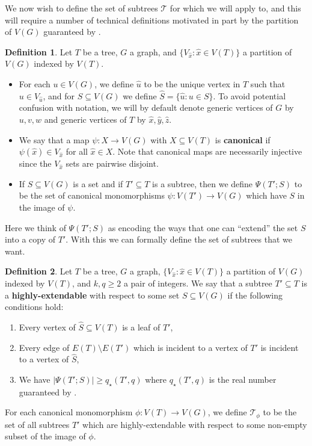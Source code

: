 \documentclass[12pt,letterpaper]{article}
\theoremstyle{definition}
\newtheorem{definition}{Definition}
\newcommand{\pow}{q} %
\newcommand{\Pow}{{q_\star}} %
\renewcommand{\c}[1]{\mathcal{#1}}
\newcommand{\sm}{\setminus}
\newcommand{\sub}{\subseteq}
\begin{document}
	We now wish to define the set of subtrees $\c{T}$ for which we will apply  to, and this will require a number of technical definitions motivated in part by the partition of $V(G)$ guaranteed by .  
	
	\begin{definition}
		Let $T$ be a tree, $G$ a graph, and $\{V_{\hat{x}}:\hat{x}\in V(T)\}$ a partition of $V(G)$ indexed by $V(T)$.
		\begin{itemize}
			\item For each $u\in V(G)$, we define $\hat{u}$ to be the unique vertex in $T$ such that $u\in V_{\hat{u}}$, and for $S\sub V(G)$ we define $\widehat{S}=\{\hat{u}:u\in S\}$.  To avoid potential confusion with notation, we will by default denote generic vertices of $G$ by $u,v,w$ and generic vertices of $T$ by $\hat{x},\hat{y},\hat{z}$.  
			\item We say that a map $\psi:X\to V(G)$ with $X\sub V(T)$ is \textbf{canonical} if $\psi(\hat{x})\in V_{\hat{x}}$ for all $\hat{x}\in X$.  Note that canonical maps are necessarily injective since the $V_{\hat{x}}$ sets are pairwise disjoint. 
			\item If $S\sub V(G)$ is a set and if $T'\sub T$ is a subtree, then we define $\Psi(T';S)$ to be the set of canonical monomorphisms $\psi:V(T')\to V(G)$ which have $S$ in the image of $\psi$.
		\end{itemize}
	\end{definition}
	Here we think of $\Psi(T';S)$ as encoding the ways that one can ``extend'' the set $S$ into a copy of $T'$. With this we can formally define the set of subtrees that we want.
	
	\begin{definition}
		Let $T$ be a tree, $G$ a graph, $\{V_{\hat{x}}:\hat{x}\in V(T)\}$ a partition of $V(G)$ indexed by $V(T)$, and $k,\pow\ge 2$ a pair of integers.  We say that a subtree $T'\sub T$ is a \textbf{highly-extendable} with respect to some set $S\sub V(G)$ if the following conditions hold:
		\begin{enumerate}[label=(\alph*)]
			\item Every vertex of $\widehat{S}\sub V(T)$ is a leaf of $T'$,\label{condition highly extendable definition (a) leaf of T'}
			\item Every edge of $E(T)\sm E(T')$ which is incident to a vertex of $T'$ is incident to a vertex of $\widehat{S}$, \label{condition highly extendable defintion (b) edges incident}
			\item We have $|\Psi(T';S)|\geq \Pow(T',q)$ where $\Pow(T',q)$ is the real number guaranteed by .\label{condition highly extendable definition (c) many canonical morphisms}
		\end{enumerate}
		For each canonical monomorphism $\phi:V(T)\to V(G)$, we define $\c{T}_\phi$ to be the set of all subtrees $T'$ which are highly-extendable with respect to some non-empty subset of the image of $\phi$.
	\end{definition}
	
\end{document}
